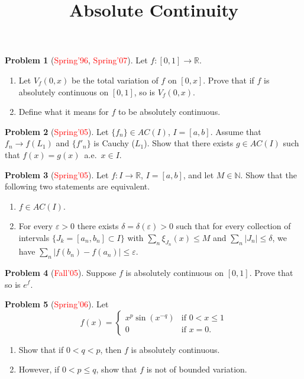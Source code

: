 \documentclass[12pt]{amsart}
\def\field#1{\mathbb{#1}}
\def\abs#1{\lvert {#1} \rvert}
\theoremstyle{definition}
\newtheorem{problem}{Problem}
\theoremstyle{remark}
\begin{document}
\title{Absolute Continuity}
\maketitle

\begin{problem}[\textcolor{red}{Spring'96}, \textcolor{red}{Spring'07}]
  Let $f\colon [0,1] \to \field{R}$.
  \begin{enumerate}
  \item Let $V_f(0,x)$ be the total variation of $f$ on $[0,x]$. Prove
    that if $f$ is absolutely continuous on $[0,1]$, so is $V_f(0,x)$.
  \item Define what it means for $f$ to be absolutely continuous.
  \end{enumerate}
\end{problem}
\begin{problem}[\textcolor{red}{Spring'05}]
  Let $\{ f_n \} \in AC(I)$, $I = [a,b]$. Assume that $f_n \to f
  (L_1)$ and $\{ f'_n\}$ is Cauchy ($L_1$).  Show that there exists $g
  \in AC(I)$ such that $f(x) = g(x)$~a.e.~$x \in I$.
\end{problem}
\begin{problem}[\textcolor{red}{Spring'05}]
  Let $f\colon I \to \field{R}$, $I = [a,b]$, and let $M \in
  \field{N}$.  Show that the following two statements are equivalent.
  \begin{enumerate}
  \item $f \in AC(I)$.
  \item For every $\varepsilon >0$ there exists $\delta =
    \delta(\varepsilon) > 0$ such that for every collection of
    intervals $\{ J_k = [a_n, b_n] \subset I \}$ with $\sum_n
    \xi_{J_n}(x) \leq M$ and $\sum_n \abs{J_n} \leq \delta$, we have
    $\sum_n \abs{ f(b_n) - f(a_n) } \leq \varepsilon$.
  \end{enumerate}
\end{problem}
\begin{problem}[\textcolor{red}{Fall'05}]
  Suppose $f$ is absolutely continuous on $[0,1]$.  Prove that so is
  $e^f$.
\end{problem}
\begin{problem}[\textcolor{red}{Spring'06}]
  Let
  \begin{equation*}
    f(x) = \begin{cases} 
      x^p \sin (x^{-q}) &\text{if } 0 < x\leq 1\\
      0 &\text{if }x=0.
    \end{cases}
  \end{equation*}
  \begin{enumerate}
  \item Show that if $0<q<p$, then $f$ is absolutely continuous.
  \item However, if $0<p\leq q$, show that $f$ is not of bounded
  variation.
  \end{enumerate}
\end{problem}
\end{document}
